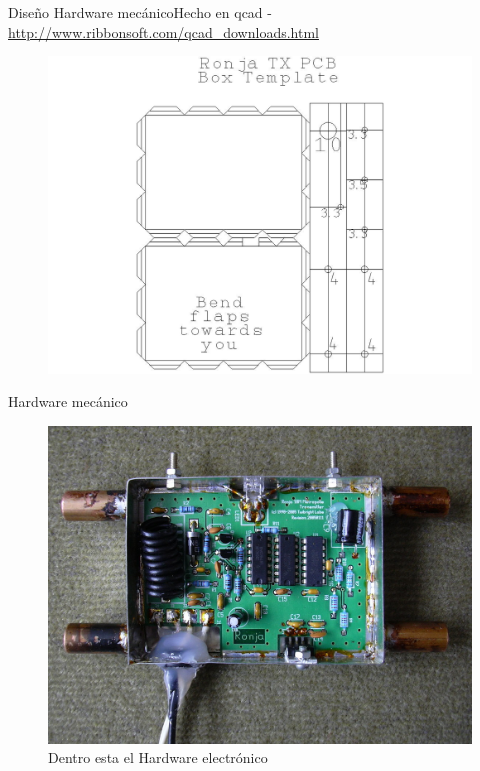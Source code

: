 \documentclass{beamer}
\begin{document}
\begin{frame}{Diseño Hardware mecánico}{Hecho en \alert{qcad} - \url{http://www.ribbonsoft.com/qcad_downloads.html}}
  \begin{figure}
    \includegraphics[scale=0.225]{transmisor/tx_pcb2}
  \end{figure}
\end{frame}

\begin{frame}{Hardware mecánico}
  \begin{figure}
    \includegraphics[scale=0.85]{transmisor/1b76}
    \caption{Dentro esta el Hardware electrónico}
  \end{figure}
\end{frame}
\end{document}
